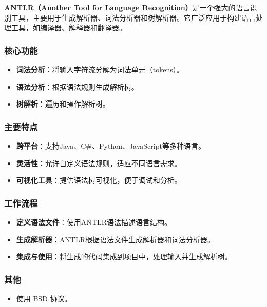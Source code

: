 
\textbf{ANTLR（Another Tool for Language Recognition）}是一个强大的语言识别工具，主要用于生成解析器、词法分析器和树解析器。它广泛应用于构建语言处理工具，如编译器、解释器和翻译器。

\subsubsection{核心功能}
\begin{itemize}
\item \textbf{\textbf{词法分析}}：将输入字符流分解为词法单元（tokens）。
\item \textbf{语法分析}：根据语法规则生成解析树。
\item \textbf{树解析}：遍历和操作解析树。
\end{itemize}

\subsubsection{主要特点}
\begin{itemize}
\item \textbf{\textbf{跨平台}}：支持Java、C#、Python、JavaScript等多种语言。
\item \textbf{灵活性}：允许自定义语法规则，适应不同语言需求。
\item \textbf{可视化工具}：提供语法树可视化，便于调试和分析。
\end{itemize}

\subsubsection{工作流程}
\begin{itemize}
\item \textbf{定义语法文件}：使用ANTLR语法描述语言结构。
\item \textbf{生成解析器}：ANTLR根据语法文件生成解析器和词法分析器。
\item \textbf{集成与使用}：将生成的代码集成到项目中，处理输入并生成解析树。
\end{itemize}

\subsubsection{其他}
\begin{itemize}
\item 使用 BSD 协议。
\end{itemize}
